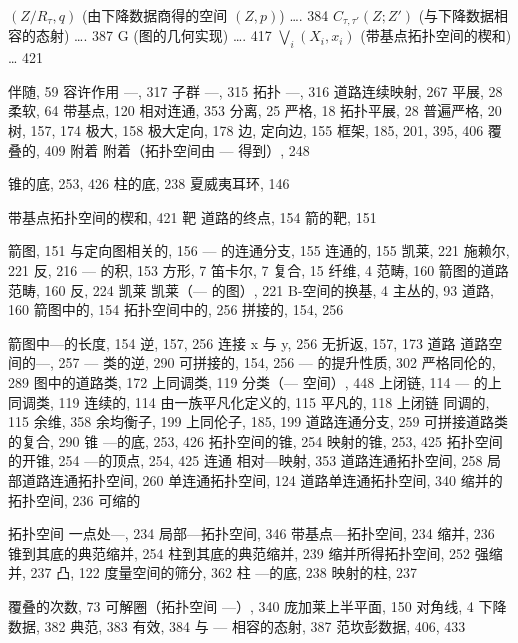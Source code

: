 \((Z/R_{\tau},q)\) (由下降数据商得的空间 \((Z,p)\)) \ldots. 384 \(C_{\tau,\tau'}(Z;Z')\) (与下降数据相容的态射) \ldots. 387 \textbar G\textbar{} (图的几何实现) \ldots. 417 \(\bigvee_{i}(X_{i},x_{i})\) (带基点拓扑空间的楔和) \ldots{} 421



伴随, 59 容许作用 ---, 317 子群 ---, 315 拓扑 ---, 316 道路连续映射, 267 平展, 28 柔软, 64 带基点, 120 相对连通, 353 分离, 25 严格, 18 拓扑平展, 28 普遍严格, 20 树, 157, 174 极大, 158 极大定向, 178 边, 定向边, 155 框架, 185, 201, 395, 406 覆叠的, 409 附着 附着（拓扑空间由 --- 得到）, 248


锥的底, 253, 426 柱的底, 238 夏威夷耳环, 146

带基点拓扑空间的楔和, 421 靶 道路的终点, 154 箭的靶, 151


箭图, 151 与定向图相关的, 156 --- 的连通分支, 155 连通的, 155 凯莱, 221 施赖尔, 221 反, 216 --- 的积, 153 方形, 7 笛卡尔, 7 复合, 15 纤维, 4 范畴, 160 箭图的道路范畴, 160 反, 224 凯莱 凯莱（--- 的图）, 221 B-空间的换基, 4 主丛的, 93 道路, 160 箭图中的, 154 拓扑空间中的, 256 拼接的, 154, 256

箭图中---的长度, 154 逆, 157, 256 连接 x 与 y, 256 无折返, 157, 173 道路 道路空间的---, 257 --- 类的逆, 290 可拼接的, 154, 256 --- 的提升性质, 302 严格同伦的, 289 图中的道路类, 172 上同调类, 119 分类（--- 空间）, 448 上闭链, 114 --- 的上同调类, 119 连续的, 114 由一族平凡化定义的, 115 平凡的, 118 上闭链 同调的, 115 余维, 358 余均衡子, 199 上同伦子, 185, 199 道路连通分支, 259 可拼接道路类的复合, 290 锥 ---的底, 253, 426 拓扑空间的锥, 254 映射的锥, 253, 425 拓扑空间的开锥, 254 ---的顶点, 254, 425 连通 相对---映射, 353 道路连通拓扑空间, 258 局部道路连通拓扑空间, 260 单连通拓扑空间, 124 道路单连通拓扑空间, 340 缩并的 拓扑空间, 236 可缩的

拓扑空间 一点处---, 234 局部---拓扑空间, 346 带基点---拓扑空间, 234 缩并, 236 锥到其底的典范缩并, 254 柱到其底的典范缩并, 239 缩并所得拓扑空间, 252 强缩并, 237 凸, 122 度量空间的筛分, 362 柱 ---的底, 238 映射的柱, 237


覆叠的次数, 73 可解圈（拓扑空间 ---）, 340 庞加莱上半平面, 150 对角线, 4 下降数据, 382 典范, 383 有效, 384 与 --- 相容的态射, 387 范坎彭数据, 406, 433


